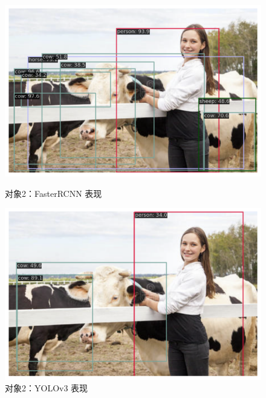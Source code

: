 \documentclass[notitlepage,cs4size,punct,oneside]{ctexrep}
\numberwithin{equation}{chapter}
\theoremstyle{mystyle}
\begin{document}
\begin{figure}[!htpb]
    \centering
    \begin{minipage}[t]{0.49\textwidth}
    \includegraphics[width=\linewidth]{cnntest2.png}
    \caption{对象2：FasterRCNN 表现}
    \label{mAPfrcnn}
    \end{minipage}
    \begin{minipage}[t]{0.49\textwidth}
        \includegraphics[width=\linewidth]{yolotest2.png}
    \caption{对象2：YOLOv3 表现}
    \label{frcnn_loss}
    \end{minipage}
\end{figure}
\end{document}
